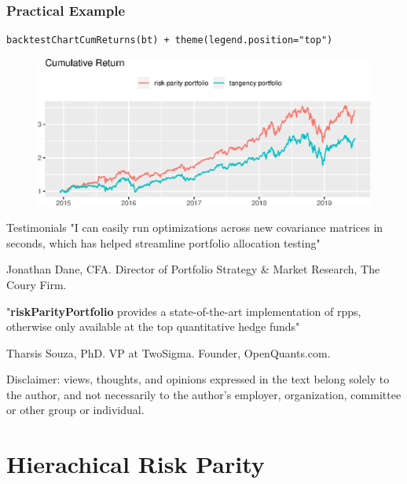 \documentclass[aspectratio=169]{beamer}
\begin{document}
\begin{frame}[fragile]
\frametitle{Practical Example}
\begin{verbatim}
backtestChartCumReturns(bt) + theme(legend.position="top")
\end{verbatim}
\begin{figure}[!htb]
  \centering
  \includegraphics[scale=.7]{codes/returns.eps}
\end{figure}
\end{frame}

\begin{frame}{Testimonials}
  \vspace{.5cm}
  "I can easily run optimizations across new covariance matrices in seconds, which has helped streamline portfolio allocation testing"\linebreak
  \begin{flushright}Jonathan Dane, CFA. Director of Portfolio Strategy \& Market Research, The Coury Firm.\end{flushright}

    "\textbf{riskParityPortfolio} provides a state-of-the-art
   implementation of rpps, otherwise only available at the top quantitative
   hedge funds"\linebreak
   \begin{flushright}Tharsis Souza, PhD. VP at TwoSigma. Founder, OpenQuants.com.\end{flushright}

   {\footnotesize Disclaimer: views, thoughts, and opinions expressed in the text belong solely to the author,
   and not necessarily to the author’s employer, organization, committee or other group or individual.}
\end{frame}

\section{Hierachical Risk Parity}
\end{document}
